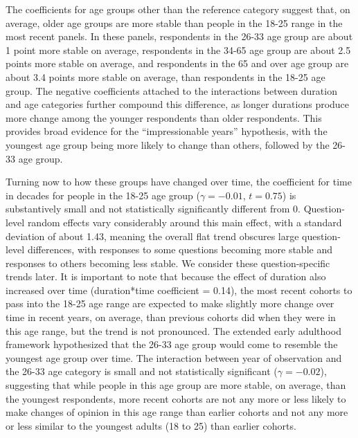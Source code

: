 \documentclass[
  12pt,
]{article}
\begin{document}
The coefficients for age groups other than the reference category suggest that, on average, older age groups are more stable than people in the 18-25 range in the most recent panels. In these panels, respondents in the 26-33 age group are about 1 point more stable on average, respondents in the 34-65 age group are about 2.5 points more stable on average, and respondents in the 65 and over age group are about 3.4 points more stable on average, than respondents in the 18-25 age group. The negative coefficients attached to the interactions between duration and age categories further compound this difference, as longer durations produce more change among the younger respondents than older respondents. This provides broad evidence for the ``impressionable years'' hypothesis, with the youngest age group being more likely to change than others, followed by the 26-33 age group.

Turning now to how these groups have changed over time, the coefficient for time in decades for people in the 18-25 age group (\(\gamma = -0.01\), \(t = 0.75\)) is substantively small and not statistically significantly different from 0. Question-level random effects vary considerably around this main effect, with a standard deviation of about 1.43, meaning the overall flat trend obscures large question-level differences, with responses to some questions becoming more stable and responses to others becoming less stable. We consider these question-specific trends later. It is important to note that because the effect of duration also increased over time (duration*time coefficient = 0.14), the most recent cohorts to pass into the 18-25 age range are expected to make slightly more change over time in recent years, on average, than previous cohorts did when they were in this age range, but the trend is not pronounced.
The extended early adulthood framework hypothesized that the 26-33 age group would come to resemble the youngest age group over time. The interaction between year of observation and the 26-33 age category is small and not statistically significant (\(\gamma = -0.02\)), suggesting that while people in this age group are more stable, on average, than the youngest respondents, more recent cohorts are not any more or less likely to make changes of opinion in this age range than earlier cohorts and not any more or less similar to the youngest adults (18 to 25) than earlier cohorts.
\end{document}
